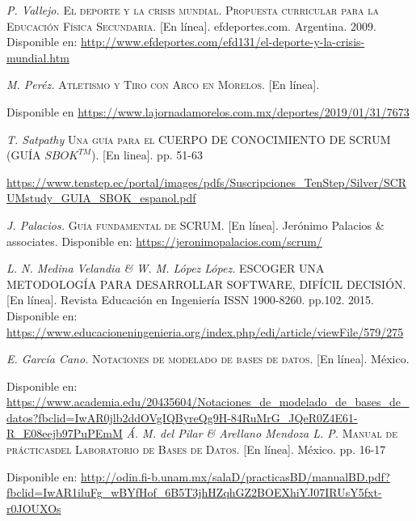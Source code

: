 \begin{thebibliography}{}
	\textit{P. Vallejo.}
	\textsc{El deporte y la crisis mundial. Propuesta curricular para la Educación Física Secundaria.} [En línea]. 
	efdeportes.com. Argentina. 2009.
	Disponible en: 
	\url{http://www.efdeportes.com/efd131/el-deporte-y-la-crisis-mundial.htm}
	
	\textit{M. Peréz.}
	\textsc{Atletismo y Tiro con Arco en Morelos.} [En línea].
	
	Disponible en 
	\url{https://www.lajornadamorelos.com.mx/deportes/2019/01/31/7673}
	
	\textit{T. Satpathy}
	\textsc{Una guía para el CUERPO DE CONOCIMIENTO DE SCRUM (GUÍA $SBOK^{TM}$).} [En linea]. pp. 51-63 
	
	\url{https://www.tenstep.ec/portal/images/pdfs/Suscripciones_TenStep/Silver/SCRUMstudy_GUIA_SBOK_espanol.pdf}
	
	\textit{J. Palacios.}
	\textsc{Guía fundamental de SCRUM.} [En línea]. 
	Jerónimo Palacios \& associates. 
	Disponible en: 
	\url{https://jeronimopalacios.com/scrum/}
	
	\textit{L. N. Medina Velandia \& W. M. López López.}
	\textsc{ESCOGER UNA METODOLOGÍA PARA DESARROLLAR SOFTWARE, DIFÍCIL DECISIÓN.} [En línea]. 
	Revista Educación en Ingeniería ISSN 1900-8260. pp.102. 2015. 
	Disponible en: 
	\url{https://www.educacioneningenieria.org/index.php/edi/article/viewFile/579/275}
	
	\textit{E. García Cano.}
	\textsc{Notaciones de modelado de bases de datos.} [En línea]. México.
	
	Disponible en:
	\url{https://www.academia.edu/20435604/Notaciones_de_modelado_de_bases_de_datos?fbclid=IwAR0jlb2ddOVgIQByreQg9H-84RuMrG_JQeR0Z4E61-R_E08eejb97PuPEmM}
	\textit{Á. M. del Pilar \& Arellano Mendoza L. P.}
	\textsc{Manual de prácticasdel Laboratorio de Bases de Datos.} [En línea]. México. pp. 16-17
	
	Disponible en: 
	\url{http://odin.fi-b.unam.mx/salaD/practicasBD/manualBD.pdf?fbclid=IwAR1iluFg_wBYfHof_6B5T3jhHZqhGZ2BOEXhiYJ07IRUsY5fxt-r0JOUXOs}
	

\end{thebibliography}
